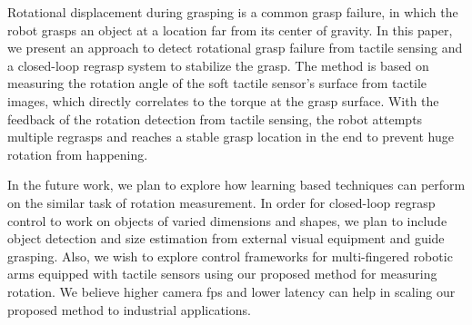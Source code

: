 Rotational displacement during grasping is a common grasp failure, in which the robot grasps an object at a location far from its center of gravity. In this paper, we present an approach to detect rotational grasp failure from tactile sensing and a closed-loop regrasp 
system to stabilize the grasp. The method is based on measuring the rotation angle of the soft tactile sensor's surface from tactile images, which directly correlates to the torque at the grasp surface. With the feedback of the rotation detection from tactile sensing, the robot attempts multiple regrasps and reaches a stable grasp location in the end to prevent huge rotation from happening.


In the future work, we plan to explore how learning based techniques can perform on the similar task of rotation measurement. In order for closed-loop regrasp control to work on objects of varied dimensions and shapes, we plan to include object detection and size estimation from external visual equipment and guide grasping. Also, we wish to explore control frameworks for multi-fingered robotic arms equipped with tactile sensors using our proposed method for measuring rotation. We believe higher camera fps and lower latency can help in scaling our proposed method to industrial applications. 


